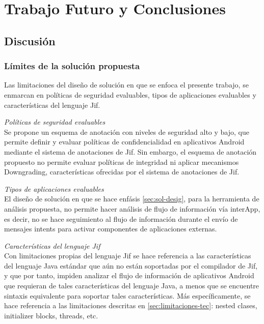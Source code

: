 \label{ch:trabajoFuturo}
\chapter{Trabajo Futuro y Conclusiones}
\section{Discusión}
\subsection{Límites de la solución propuesta}
Las limitaciones del diseño de solución en que se enfoca el presente trabajo, se
enmarcan en políticas de seguridad evaluables, tipos de aplicaciones evaluables 
y características del lenguaje Jif.

\emph{Políticas de seguridad evaluables}\\
Se propone un esquema de anotación con niveles de seguridad alto y
bajo, que permite definir y evaluar políticas de confidencialidad en aplicativos
Android mediante el sistema de anotaciones de Jif.
Sin embargo, el esquema de anotación propuesto no permite evaluar políticas de
integridad ni aplicar mecanismos Downgrading, características ofrecidas por el
sistema de anotaciones de Jif.

\emph{Tipos de aplicaciones evaluables}\\
El diseño de solución en que se hace enfásis \ref{sec:sol-desig}, para la
herramienta de análisis propuesta, no permite hacer análisis de flujo de
información vía interApp, es decir, no se hace seguimiento al flujo de
información durante el envío de mensajes intents para activar componentes de
aplicaciones externas.

\emph{Características del lenguaje Jif}\\
Con limitaciones propias del lenguaje Jif se hace referencia a las
características del lenguaje Java estándar que aún no están soportadas por el
compilador de Jif, y que por tanto, impiden analizar el flujo de información de
aplicativos Android que requieran de tales características del lenguaje Java, a
menos que se encuentre sintaxis equivalente para soportar tales
características.\newline 
Más específicamente, se hace referencia a las limitaciones descritas en
\ref{sec:limitaciones-tec}: nested clases, initializer blocks, threads, etc.

